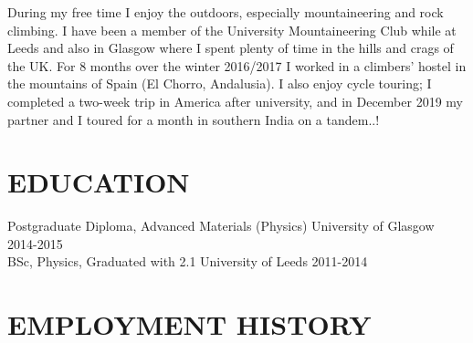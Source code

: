\documentclass[overlap, line, 10pt]{res} %
\begin{document}
\begin{resume}
During my free time I enjoy the outdoors, especially mountaineering and rock climbing. I have been a member of the University Mountaineering Club while at Leeds and also in Glasgow where I spent plenty of time in the hills and crags of the UK.
For 8 months over the winter 2016/2017 I worked in a climbers' hostel in the mountains of Spain (El Chorro, Andalusia). I also enjoy cycle touring; I completed a two-week trip in America after university, and in December 2019 my partner and I toured for a month in southern India on a tandem..!

\section{EDUCATION}

Postgraduate Diploma, Advanced Materials (Physics) University of Glasgow 2014-2015\\
BSc, Physics, Graduated with 2.1 University of Leeds 2011-2014

\pagebreak

\section{EMPLOYMENT HISTORY}


\end{resume}
\end{document}
